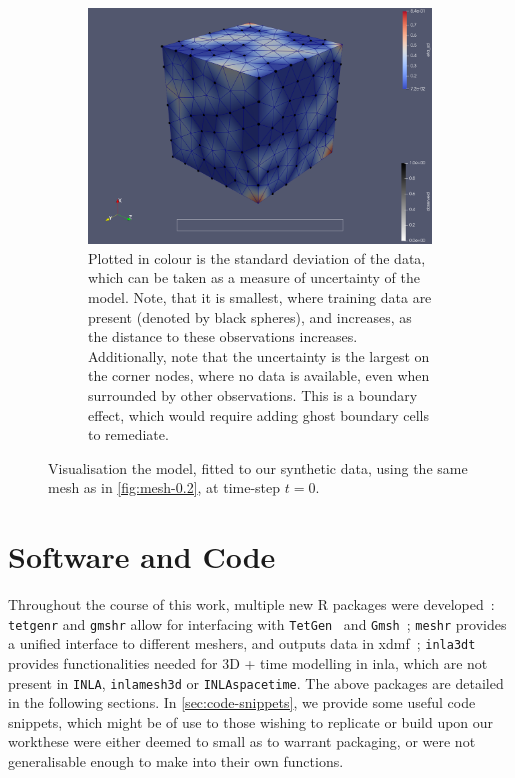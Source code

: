 \documentclass[british]{scrreprt}
\begin{document}
\begin{figure}
    \begin{subfigure}{0.8\textwidth}
        \includegraphics{img/mesh_0.2_sd.png}
        \caption{Plotted in colour is the standard deviation of the data, which can be taken as a measure of uncertainty of the model. Note, that it is smallest, where training data are present (denoted by black spheres), and increases, as the distance to these observations increases. Additionally, note that the uncertainty is the largest on the corner nodes, where no data is available, even when surrounded by other observations. This is a boundary effect, which would require adding ghost boundary cells to remediate.}
        \label{fig:mesh-0.2-sd}
    \end{subfigure}

    \caption{Visualisation the model, fitted to our synthetic data, using the same mesh as in \cref{fig:mesh-0.2}, at time-step \( t = 0 \).}
    \label{fig:inla-results}
\end{figure}

\chapter{Software and Code}
\label{ch:code}
Throughout the course of this work, multiple new R packages were developed~\cite{Sudwojinla3dt2022}: \texttt{tetgenr} and \texttt{gmshr} allow for interfacing with \texttt{TetGen}~\cite{SiTetGenDelaunayBasedQuality2015} and \texttt{Gmsh}~\cite{GeuzaineGmsh3Dfinite2009}; \texttt{meshr} provides a unified interface to different meshers, and outputs data in \gls{xdmf}~\cite{XDMF}; \texttt{inla3dt} provides functionalities needed for 3D + time modelling in \gls{inla}, which are not present in \texttt{INLA}, \texttt{inlamesh3d} or \texttt{INLAspacetime}. The above packages are detailed in the following sections. In \cref{sec:code-snippets}, we provide some useful code snippets, which might be of use to those wishing to replicate or build upon our work\textemdash{}these were either deemed to small as to warrant packaging, or were not generalisable enough to make into their own functions.
\end{document}
